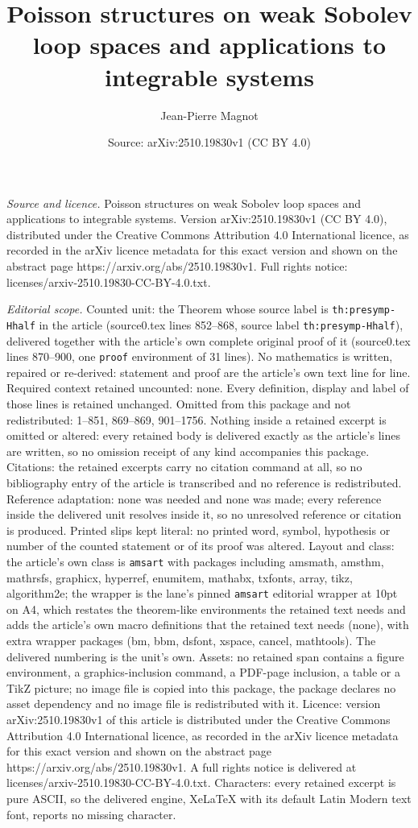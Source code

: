 \documentclass[10pt,a4paper]{amsart}
\title[Poisson structures on weak Sobolev loop spaces and applicati]{Poisson structures on weak Sobolev loop spaces and applications to integrable systems}
\author{Jean-Pierre Magnot}
\date{Source: arXiv:2510.19830v1 (CC BY 4.0)}
\begin{document}
\maketitle

\noindent\emph{Source and licence.} Poisson structures on weak Sobolev loop spaces and applications to integrable systems. Version arXiv:2510.19830v1 (CC BY 4.0), distributed under the Creative Commons Attribution 4.0 International licence, as recorded in the arXiv licence metadata for this exact version and shown on the abstract page https://arxiv.org/abs/2510.19830v1. Full rights notice: licenses/arxiv-2510.19830-CC-BY-4.0.txt.\par\smallskip

\noindent\textit{Editorial scope.} Counted unit: the Theorem whose source label is \texttt{th:presymp-Hhalf} in the article (source0.tex lines 852--868, source label \texttt{th:presymp-Hhalf}), delivered together with the article's own complete original proof of it (source0.tex lines 870--900, one \texttt{proof} environment of 31 lines). No mathematics is written, repaired or re-derived: statement and proof are the article's own text line for line. Required context retained uncounted: none. Every definition, display and label of those lines is retained unchanged. Omitted from this package and not redistributed: 1--851, 869--869, 901--1756. Nothing inside a retained excerpt is omitted or altered: every retained body is delivered exactly as the article's lines are written, so no omission receipt of any kind accompanies this package. Citations: the retained excerpts carry no citation command at all, so no bibliography entry of the article is transcribed and no reference is redistributed. Reference adaptation: none was needed and none was made; every reference inside the delivered unit resolves inside it, so no unresolved reference or citation is produced. Printed slips kept literal: no printed word, symbol, hypothesis or number of the counted statement or of its proof was altered. Layout and class: the article's own class is \texttt{amsart} with packages including amsmath, amsthm, mathrsfs, graphicx, hyperref, enumitem, mathabx, txfonts, array, tikz, algorithm2e; the wrapper is the lane's pinned \texttt{amsart} editorial wrapper at 10pt on A4, which restates the theorem-like environments the retained text needs and adds the article's own macro definitions that the retained text needs (none), with extra wrapper packages (bm, bbm, dsfont, xspace, cancel, mathtools). The delivered numbering is the unit's own. Assets: no retained span contains a figure environment, a graphics-inclusion command, a PDF-page inclusion, a table or a TikZ picture; no image file is copied into this package, the package declares no asset dependency and no image file is redistributed with it. Licence: version arXiv:2510.19830v1 of this article is distributed under the Creative Commons Attribution 4.0 International licence, as recorded in the arXiv licence metadata for this exact version and shown on the abstract page https://arxiv.org/abs/2510.19830v1. A full rights notice is delivered at licenses/arxiv-2510.19830-CC-BY-4.0.txt. Characters: every retained excerpt is pure ASCII, so the delivered engine, XeLaTeX with its default Latin Modern text font, reports no missing character.
\end{document}
